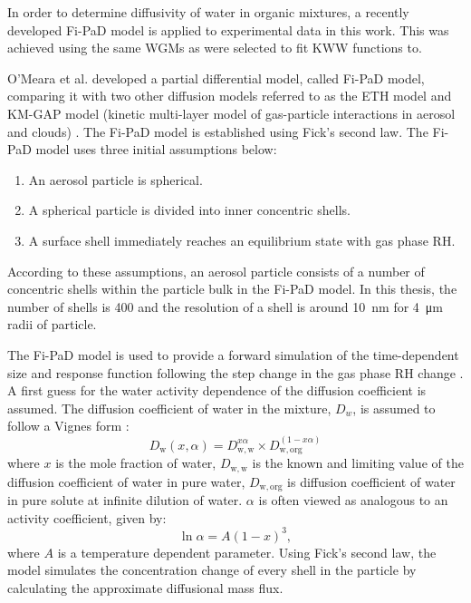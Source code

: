 In order to determine diffusivity of water in organic mixtures, a recently developed Fi-PaD model is applied to experimental data in this work. This was achieved using the same WGMs as were selected to fit KWW functions to.

O’Meara et al. developed a partial differential model, called Fi-PaD model, comparing it with two other diffusion models referred to as the ETH model and KM-GAP model (kinetic multi-layer model of gas-particle interactions in aerosol and clouds) \cite{omearaRateEquilibrationViscous2016}. The Fi-PaD model is established using Fick’s second law. The Fi-PaD model uses three initial assumptions below:
\begin{enumerate}
    \item An aerosol particle is spherical.
    \item A spherical particle is divided into inner concentric shells.
    \item A surface shell immediately reaches an equilibrium state with gas phase RH.
\end{enumerate}
According to these assumptions, an aerosol particle consists of a number of concentric shells within the particle bulk in the Fi-PaD model. In this thesis, the number of shells is \num{400} and the resolution of a shell is around \SI{10}{\nano\meter} for \SI{4}{\micro\meter} radii of particle. 

The Fi-PaD model is used to provide a forward simulation of the time-dependent size and response function following the step change in the gas phase RH change \cite{omearaRateEquilibrationViscous2016,Ingram2017}. A first guess for the water activity dependence of the diffusion coefficient is assumed. The diffusion coefficient of water in the mixture, $D_{w}$, is assumed to follow a Vignes form \cite{omearaRateEquilibrationViscous2016,Ingram2017}:
\begin{equation}\label{eqn:vignes_form}
D_{\mathrm{w}}(x, \alpha)=D_{\mathrm{w, w}}^{x \alpha} \times D_{\mathrm{w}, \mathrm{org}}^{(1-x \alpha)}
\end{equation}
where $x$ is the mole fraction of water, $D_{\mathrm{w, w}}$ is the known and limiting value of the diffusion coefficient of water in pure water, $D_{\mathrm{w}, \mathrm{org}}$ is diffusion coefficient of water in pure solute at infinite dilution of water. $\alpha$ is often viewed as analogous to an activity coefficient, given by:
\begin{equation}
\ln \alpha=A(1-x)^{3},
\end{equation}
where $A$ is a temperature dependent parameter. Using Fick’s second law, the model simulates the concentration change of every shell in the particle by calculating the approximate diffusional mass flux.  

